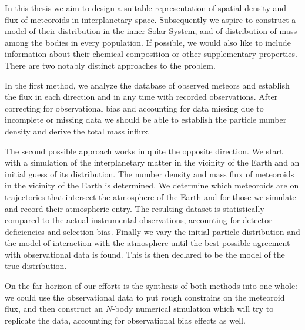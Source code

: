 In this thesis we aim to design a suitable representation of spatial density
and flux of meteoroids in interplanetary space. Subsequently we aspire to
construct a model of their distribution in the inner Solar System,
and of distribution of mass among the bodies in every population.
If possible, we would also like to include information
about their chemical composition or other supplementary properties.
There are two notably distinct approaches to the problem.

In the first method, we analyze the database of observed meteors and establish
the flux in each direction and in any time with recorded observations.
After correcting for observational bias and accounting for data missing due
to incomplete or missing data we should be able to establish the particle
number density and derive the total mass influx.

The second possible approach works in quite the opposite direction. We start with a simulation
of the interplanetary matter in the vicinity of the Earth and an initial guess of its distribution.
The number density and mass flux of meteoroids in the vicinity of the Earth is determined.
We determine which meteoroids are on trajectories that intersect the atmosphere of the Earth
and for those we simulate and record their atmospheric entry. The resulting dataset is statistically compared
to the actual instrumental observations, accounting for detector deficiencies and selection bias.
Finally we vary the initial particle distribution and the model of interaction with the atmosphere
until the best possible agreement with observational data is found.
This is then declared to be the model of the true distribution.

On the far horizon of our efforts is the synthesis of both methods into one whole:
we could use the observational data to put rough constrains on the meteoroid flux,
and then construct an $N$-body numerical simulation which will try to replicate the data,
accounting for observational bias effects as well.
